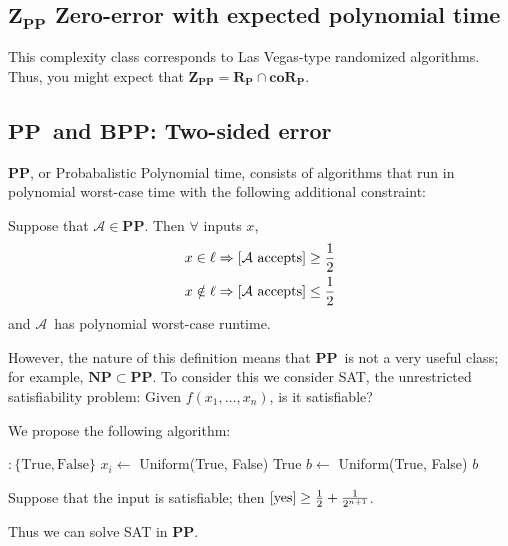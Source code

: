 \documentclass[11pt]{article}
\let\Pr\relax
\DeclareMathOperator*{\Pr}{\mathbb{P}}
\newcommand{\NP}{\ensuremath{\mathbf{NP}}}
\newcommand{\PP}{\ensuremath{\mathbf{PP}}}
\newcommand{\BPP}{\ensuremath{\mathbf{BPP}}}
\newcommand{\ZPP}{\ensuremath{\mathbf{Z_{PP}}}}
\newcommand{\RP}{\ensuremath{\mathbf{R_{P}}}}
\newcommand{\coRP}{\ensuremath{\mathbf{coR_{P}}}}
\newcommand{\Alg}{\ensuremath{\mathcal{A}}}
\begin{document}
\subsection{\ZPP\: Zero-error with expected polynomial time}

This complexity class corresponds to Las Vegas-type randomized algorithms. Thus, you might expect that $\ZPP = \RP \cap \coRP$.

\subsection{\PP\ and \BPP: Two-sided error }

\PP, or Probabalistic Polynomial time, consists of algorithms that run in polynomial worst-case time with the following additional constraint:

Suppose that $\Alg\in\PP$. Then $\forall$ inputs $x$,
\begin{align*}
  x \in \ell &\Rightarrow \Pr[\Alg \text{ accepts}] \ge \frac{1}{2} \\
  x \notin \ell &\Rightarrow \Pr[\Alg \text{ accepts}] \le \frac{1}{2} \\
\end{align*}
and \Alg\ has polynomial worst-case runtime.

However, the nature of this definition means that \PP\ is not a very useful class; for example, $\NP\subset\PP$. To consider this we consider SAT, the unrestricted satisfiability problem: Given $f(x_1, \dots, x_n)$, is it satisfiable?

We propose the following algorithm:

\begin{algorithm}[H]
\begin{algorithmic}
$: \{\mathrm{True},\mathrm{False}\}$
    \State $x_i \gets $ Uniform(True, False)
  \EndFor
    \State \Return True
  \Else
    \State $b \gets $ Uniform(True, False)
    \State \Return $b$
  \EndIf
\EndFunction
\end{algorithmic}
\end{algorithm}

Suppose that the input is satisfiable; then $\Pr[\text{yes}] \geq \frac{1}{2} + \frac{1}{2^{n+1}}$.

Thus we can solve SAT in \PP.
\end{document}
